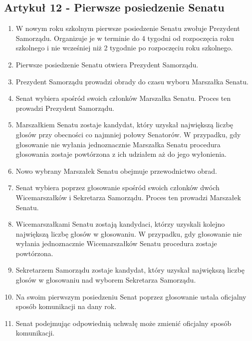 \documentclass[14pt]{article}
\newenvironment{ustepy}{%
	\begin{enumerate}[leftmargin=1.5em, itemindent=1pt, labelwidth=1em, itemsep=5pt]
	}{%
	\end{enumerate}
}
\begin{document}
\subsection*{Artykuł 12 - Pierwsze posiedzenie Senatu}
\begin{ustepy}
	\item W nowym roku szkolnym pierwsze posiedzenie Senatu zwołuje Prezydent Samorządu. Organizuje je w terminie do 4 tygodni od rozpoczęcia roku szkolnego i nie wcześniej niż 2 tygodnie po rozpoczęciu roku szkolnego.
	\item Pierwsze posiedzenie Senatu otwiera Prezydent Samorządu.
	\item Prezydent Samorządu prowadzi obrady do czasu wyboru Marszałka Senatu.
	\item Senat wybiera spośród swoich członków Marszałka Senatu. Proces ten prowadzi Prezydent Samorządu.
	\item Marszałkiem Senatu zostaje kandydat, który uzyskał największą liczbę głosów przy obecności co najmniej połowy Senatorów. W przypadku, gdy głosowanie nie wyłania jednoznacznie Marszałka Senatu procedura głosowania zostaje powtórzona z ich udziałem aż do jego wyłonienia.
	\item Nowo wybrany Marszałek Senatu obejmuje przewodnictwo obrad.
	\item Senat wybiera poprzez głosowanie spośród swoich członków dwóch Wicemarszałków i Sekretarza Samorządu. Proces ten prowadzi Marszałek Senatu.
	\item Wicemarszałkami Senatu zostają kandydaci, którzy uzyskali kolejno największą liczbę głosów w głosowaniu. W przypadku, gdy głosowanie nie wyłania jednoznacznie Wicemarszałków Senatu procedura zostaje powtórzona.
	\item Sekretarzem Samorządu zostaje kandydat, który uzyskał największą liczbę głosów w głosowaniu nad wyborem Sekretarza Samorządu.
	\item Na swoim pierwszym posiedzeniu Senat poprzez głosowanie ustala oficjalny sposób komunikacji na dany rok. 
	\item Senat podejmując odpowiednią uchwałę może zmienić oficjalny sposób komunikacji.
\end{ustepy}
\end{document}
